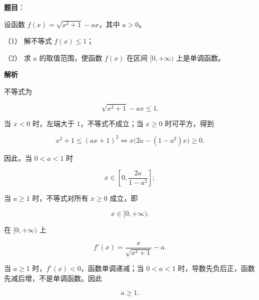 \begin{answer}

\textbf{题目}：

设函数 $f(x)=\sqrt{x^2+1}-ax$，其中 $a>0$。

（1） 解不等式 $f(x)\le1$；

（2） 求 $a$ 的取值范围，使函数 $f(x)$ 在区间 $[0,+\infty)$ 上是单调函数。

\textbf{解析}


不等式为

\nopagebreak[4]
\[
\sqrt{x^2+1}-ax\le1.
\]

当 $x<0$ 时，左端大于 $1$，不等式不成立；当 $x\ge0$ 时可平方，得到

\nopagebreak[4]
\[
x^2+1\le(ax+1)^2
\Longleftrightarrow
x\bigl(2a-(1-a^2)x\bigr)\ge0.
\]

因此，当 $0<a<1$ 时

\nopagebreak[4]
\[
x\in\left[0,\frac{2a}{1-a^2}\right];
\]

当 $a\ge1$ 时，不等式对所有 $x\ge0$ 成立，即

\nopagebreak[4]
\[
x\in[0,+\infty).
\]


在 $[0,+\infty)$ 上

\nopagebreak[4]
\[
f'(x)=\frac{x}{\sqrt{x^2+1}}-a.
\]

当 $a\ge1$ 时，$f'(x)<0$，函数单调递减；当 $0<a<1$ 时，导数先负后正，函数先减后增，不是单调函数。因此

\nopagebreak[4]
\[
a\ge1.
\]

\gkanswer{答案（1）：$a\ge1$ 时 $x\in[0,+\infty)$；$0<a<1$ 时 $x\in\left[0,\dfrac{2a}{1-a^2}\right]$。}


\end{answer}
